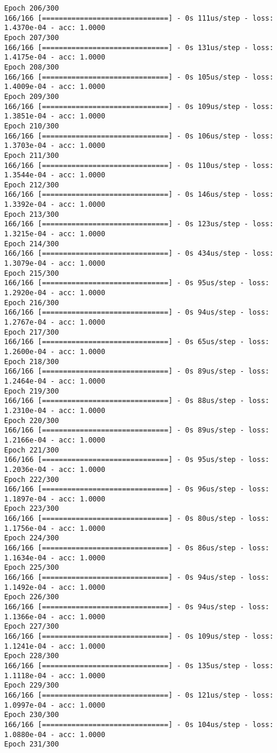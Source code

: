 \documentclass[11pt]{article}
\begin{document}
\begin{Verbatim}[commandchars=\\\{\}]
Epoch 206/300
166/166 [==============================] - 0s 111us/step - loss: 1.4370e-04 - acc: 1.0000
Epoch 207/300
166/166 [==============================] - 0s 131us/step - loss: 1.4175e-04 - acc: 1.0000
Epoch 208/300
166/166 [==============================] - 0s 105us/step - loss: 1.4009e-04 - acc: 1.0000
Epoch 209/300
166/166 [==============================] - 0s 109us/step - loss: 1.3851e-04 - acc: 1.0000
Epoch 210/300
166/166 [==============================] - 0s 106us/step - loss: 1.3703e-04 - acc: 1.0000
Epoch 211/300
166/166 [==============================] - 0s 110us/step - loss: 1.3544e-04 - acc: 1.0000
Epoch 212/300
166/166 [==============================] - 0s 146us/step - loss: 1.3392e-04 - acc: 1.0000
Epoch 213/300
166/166 [==============================] - 0s 123us/step - loss: 1.3215e-04 - acc: 1.0000
Epoch 214/300
166/166 [==============================] - 0s 434us/step - loss: 1.3079e-04 - acc: 1.0000
Epoch 215/300
166/166 [==============================] - 0s 95us/step - loss: 1.2920e-04 - acc: 1.0000
Epoch 216/300
166/166 [==============================] - 0s 94us/step - loss: 1.2767e-04 - acc: 1.0000
Epoch 217/300
166/166 [==============================] - 0s 65us/step - loss: 1.2600e-04 - acc: 1.0000
Epoch 218/300
166/166 [==============================] - 0s 89us/step - loss: 1.2464e-04 - acc: 1.0000
Epoch 219/300
166/166 [==============================] - 0s 88us/step - loss: 1.2310e-04 - acc: 1.0000
Epoch 220/300
166/166 [==============================] - 0s 89us/step - loss: 1.2166e-04 - acc: 1.0000
Epoch 221/300
166/166 [==============================] - 0s 95us/step - loss: 1.2036e-04 - acc: 1.0000
Epoch 222/300
166/166 [==============================] - 0s 96us/step - loss: 1.1897e-04 - acc: 1.0000
Epoch 223/300
166/166 [==============================] - 0s 80us/step - loss: 1.1756e-04 - acc: 1.0000
Epoch 224/300
166/166 [==============================] - 0s 86us/step - loss: 1.1634e-04 - acc: 1.0000
Epoch 225/300
166/166 [==============================] - 0s 94us/step - loss: 1.1492e-04 - acc: 1.0000
Epoch 226/300
166/166 [==============================] - 0s 94us/step - loss: 1.1366e-04 - acc: 1.0000
Epoch 227/300
166/166 [==============================] - 0s 109us/step - loss: 1.1241e-04 - acc: 1.0000
Epoch 228/300
166/166 [==============================] - 0s 135us/step - loss: 1.1118e-04 - acc: 1.0000
Epoch 229/300
166/166 [==============================] - 0s 121us/step - loss: 1.0997e-04 - acc: 1.0000
Epoch 230/300
166/166 [==============================] - 0s 104us/step - loss: 1.0880e-04 - acc: 1.0000
Epoch 231/300

\end{Verbatim}
\end{document}
